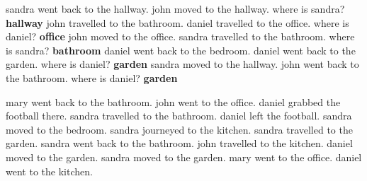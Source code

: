 



  
\begin{tcbraster}[raster columns=2, size=minimal, raster valign=top]  
    \begin{tcolorbox}[mybox, title=Task 1:Name, height fill]  
    \tiny
    sandra went back to the hallway. john moved to the hallway. where is sandra? \textbf{hallway} john travelled to the bathroom. daniel travelled to the office. where is daniel? \textbf{office} john moved to the office. sandra travelled to the bathroom. where is sandra? \textbf{bathroom} daniel went back to the bedroom. daniel went back to the garden. where is daniel? \textbf{garden} sandra moved to the hallway. john went back to the bathroom. where is daniel? \textbf{garden}  
    \end{tcolorbox}    
    \begin{tcolorbox}[mybox, title=Task 2:Name, height fill] 
    \tiny
    mary went back to the bathroom. john went to the office. daniel grabbed the football there. sandra travelled to the bathroom. daniel left the football. sandra moved to the bedroom. sandra journeyed to the kitchen. sandra travelled to the garden. sandra went back to the bathroom. john travelled to the kitchen. daniel moved to the garden. sandra moved to the garden. mary went to the office. daniel went to the kitchen. 
    

\end{tcolorbox}
\end{tcbraster}
